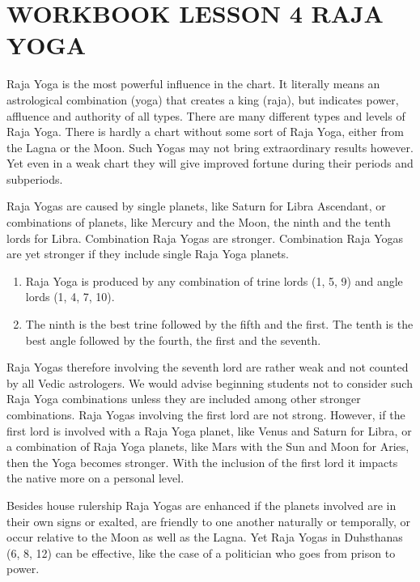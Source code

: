\section{WORKBOOK LESSON 4
RAJA YOGA}
 

Raja Yoga is the most powerful influence in the chart. It literally means an astrological combination (yoga) that creates a king (raja), but indicates power, affluence and authority of all types. There are many different types and levels of Raja Yoga. There is hardly a chart without some sort of Raja Yoga, either from the Lagna or the Moon. Such Yogas may not bring extraordinary results however. Yet even in a weak chart they will give improved fortune during their periods and subperiods.

 

Raja Yogas are caused by single planets, like Saturn for Libra Ascendant, or combinations of planets, like Mercury and the Moon, the ninth and the tenth lords for Libra. Combination Raja Yogas are stronger. Combination Raja Yogas are yet stronger if they include single Raja Yoga planets.

 
\begin{enumerate}
\item Raja Yoga is produced by any combination of trine lords (1, 5, 9) and angle lords (1, 4, 7, 10).
\item The ninth is the best trine followed by the fifth and the first. The tenth is the best angle followed by the fourth, the first and the seventh.
\end{enumerate}
 

Raja Yogas therefore involving the seventh lord are rather weak and not counted by all Vedic astrologers. We would advise beginning students not to consider such Raja Yoga combinations unless they are included among other stronger combinations. Raja Yogas involving the first lord are not strong. However, if the first lord is involved with a Raja Yoga planet, like Venus and Saturn for Libra, or a combination of Raja Yoga planets, like Mars with the Sun and Moon for Aries, then the Yoga becomes stronger. With the inclusion of the first lord it impacts the native more on a personal level.

 

Besides house rulership Raja Yogas are enhanced if the planets involved are in their own signs or exalted, are friendly to one another naturally or temporally, or occur relative to the Moon as well as the Lagna. Yet Raja Yogas in Duhsthanas (6, 8, 12) can be effective, like the case of a politician who goes from prison to power.


